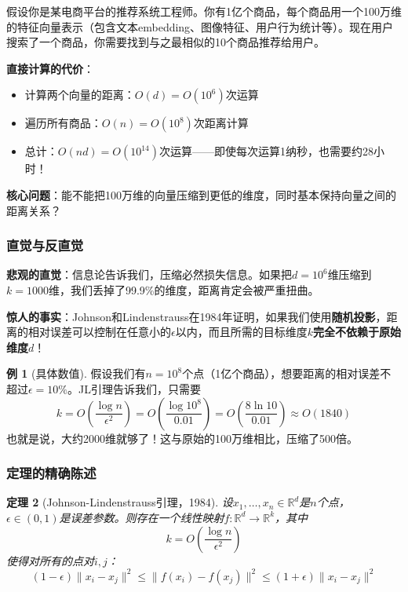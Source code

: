 \documentclass[11pt,a4paper]{ctexart}
\newtheorem{theorem}{定理}[section]
\theoremstyle{definition}
\newtheorem{example}[theorem]{例}
\theoremstyle{remark}
\begin{document}
假设你是某电商平台的推荐系统工程师。你有1亿个商品，每个商品用一个100万维的特征向量表示（包含文本embedding、图像特征、用户行为统计等）。现在用户搜索了一个商品，你需要找到与之最相似的10个商品推荐给用户。

\textbf{直接计算的代价}：
\begin{itemize}
    \item 计算两个向量的距离：$O(d) = O(10^6)$次运算
    \item 遍历所有商品：$O(n) = O(10^8)$次距离计算
    \item 总计：$O(nd) = O(10^{14})$次运算——即使每次运算1纳秒，也需要约28小时！
\end{itemize}

\textbf{核心问题}：能不能把100万维的向量压缩到更低的维度，同时基本保持向量之间的距离关系？

\subsubsection{直觉与反直觉}

\textbf{悲观的直觉}：信息论告诉我们，压缩必然损失信息。如果把$d=10^6$维压缩到$k=1000$维，我们丢掉了99.9\%的维度，距离肯定会被严重扭曲。

\textbf{惊人的事实}：Johnson和Lindenstrauss在1984年证明，如果我们使用\textbf{随机投影}，距离的相对误差可以控制在任意小的$\epsilon$以内，而且所需的目标维度$k$\textbf{完全不依赖于原始维度$d$}！

\begin{example}[具体数值]
假设我们有$n = 10^8$个点（1亿个商品），想要距离的相对误差不超过$\epsilon = 10\%$。JL引理告诉我们，只需要
\[
k = O\left(\frac{\log n}{\epsilon^2}\right) = O\left(\frac{\log 10^8}{0.01}\right) = O\left(\frac{8 \ln 10}{0.01}\right) \approx O(1840)
\]
也就是说，大约2000维就够了！这与原始的100万维相比，压缩了500倍。
\end{example}

\subsubsection{定理的精确陈述}

\begin{theorem}[Johnson-Lindenstrauss引理，1984]
设$x_1, \ldots, x_n \in \mathbb{R}^d$是$n$个点，$\epsilon \in (0,1)$是误差参数。则存在一个线性映射$f: \mathbb{R}^d \to \mathbb{R}^k$，其中
\[
k = O\left(\frac{\log n}{\epsilon^2}\right)
\]
使得对所有的点对$i, j$：
\[
(1-\epsilon)\|x_i - x_j\|^2 \leq \|f(x_i) - f(x_j)\|^2 \leq (1+\epsilon)\|x_i - x_j\|^2
\]
\end{theorem}
\end{document}
